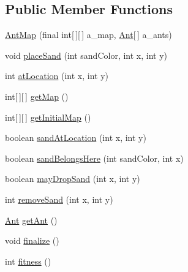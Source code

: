 \subsection*{Public Member Functions}
\begin{DoxyCompactItemize}
\item 
\hyperlink{classexamples_1_1gp_1_1painted_desert_1_1_ant_map_a13f277ea92c85cce0ac88ae86bf4a660}{Ant\-Map} (final int\mbox{[}$\,$\mbox{]}\mbox{[}$\,$\mbox{]} a\-\_\-map, \hyperlink{classexamples_1_1gp_1_1painted_desert_1_1_ant}{Ant}\mbox{[}$\,$\mbox{]} a\-\_\-ants)
\item 
void \hyperlink{classexamples_1_1gp_1_1painted_desert_1_1_ant_map_a2fdacf61c9a101d45150e1801c53cd3a}{place\-Sand} (int sand\-Color, int x, int y)
\item 
int \hyperlink{classexamples_1_1gp_1_1painted_desert_1_1_ant_map_a86da65d9ca66bb54824e94ec18e2bb7e}{at\-Location} (int x, int y)
\item 
int\mbox{[}$\,$\mbox{]}\mbox{[}$\,$\mbox{]} \hyperlink{classexamples_1_1gp_1_1painted_desert_1_1_ant_map_af7516e2ccf2b9deeefc6fc16ebfb8ece}{get\-Map} ()
\item 
int\mbox{[}$\,$\mbox{]}\mbox{[}$\,$\mbox{]} \hyperlink{classexamples_1_1gp_1_1painted_desert_1_1_ant_map_a22c4b8c6d867929f181a22a8389f7e11}{get\-Initial\-Map} ()
\item 
boolean \hyperlink{classexamples_1_1gp_1_1painted_desert_1_1_ant_map_ac94942c52d455e444eedbc7930cebd6c}{sand\-At\-Location} (int x, int y)
\item 
boolean \hyperlink{classexamples_1_1gp_1_1painted_desert_1_1_ant_map_a49737bef6006c9f6a60c601f84d7cfc2}{sand\-Belongs\-Here} (int sand\-Color, int x)
\item 
boolean \hyperlink{classexamples_1_1gp_1_1painted_desert_1_1_ant_map_a118978c36a3420debc0c13d7be7322cb}{may\-Drop\-Sand} (int x, int y)
\item 
int \hyperlink{classexamples_1_1gp_1_1painted_desert_1_1_ant_map_a0273eb3484b415b36b723e12638f5ee2}{remove\-Sand} (int x, int y)
\item 
\hyperlink{classexamples_1_1gp_1_1painted_desert_1_1_ant}{Ant} \hyperlink{classexamples_1_1gp_1_1painted_desert_1_1_ant_map_ae915cb30323586695bf98a92701726db}{get\-Ant} ()
\item 
void \hyperlink{classexamples_1_1gp_1_1painted_desert_1_1_ant_map_a4e6c68130318484bfefb84cf506b52ce}{finalize} ()
\item 
int \hyperlink{classexamples_1_1gp_1_1painted_desert_1_1_ant_map_a322b29185aeefd4f1817d05ec9b30aa1}{fitness} ()

\end{DoxyCompactItemize}
